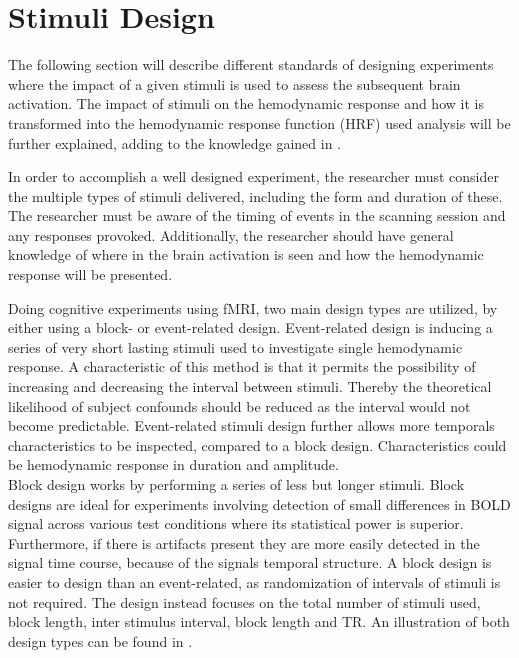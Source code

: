 \section{Stimuli Design} \label{sec:Stim}

The following section will describe different standards of designing experiments where the impact of a given stimuli is used to assess the subsequent brain activation. The impact of stimuli on the hemodynamic response and how it is transformed into the hemodynamic response function (HRF) used analysis will be further explained, adding to the knowledge gained in .

In order to accomplish a well designed experiment, the researcher must consider the multiple types of stimuli delivered, including the form and duration of these. The researcher must be aware of the timing of events in the scanning session and any responses provoked. Additionally, the researcher should have general knowledge of where in the brain activation is seen and how the hemodynamic response will be presented. \cite{Moayedi2018} 

Doing cognitive experiments using fMRI, two main design types are utilized, by either using a block- or event-related design.   
Event-related design is inducing a series of very short lasting stimuli used to investigate single hemodynamic response. A characteristic of this method is that it permits the possibility of increasing and decreasing the interval between stimuli. Thereby the theoretical likelihood of subject confounds should be reduced as the interval would not become predictable. Event-related stimuli design further allows more temporals characteristics to be inspected, compared to a block design. Characteristics could be hemodynamic response in duration and amplitude. \cite{Chee2003}  \\
Block design works by performing a series of less but longer stimuli. Block designs are ideal for experiments involving detection of small differences in BOLD signal across various test conditions where its statistical power is superior. Furthermore, if there is artifacts present they are more easily detected in the signal time course, because of the signals temporal structure. A block design is easier to design than an event-related, as randomization of intervals of stimuli is not required. The design instead focuses on the total number of stimuli used, block length, inter stimulus interval, block length and TR. An illustration of both design types can be found in . \cite{Chee2003}       

